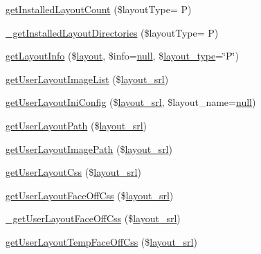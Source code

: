 \begin{DoxyCompactItemize}
\item 
\hyperlink{classlayoutModel_a0d0b74697a88270380a7f7afac1af96b}{get\+Installed\+Layout\+Count} (\$layout\+Type= \textquotesingle{}P\textquotesingle{})
\item 
\hyperlink{classlayoutModel_a4f50b5c829bf7c601a2938974a9a3b98}{\+\_\+get\+Installed\+Layout\+Directories} (\$layout\+Type= \textquotesingle{}P\textquotesingle{})
\item 
\hyperlink{classlayoutModel_a8f49f0b017ffa5fc1d12efd0dfab7c96}{get\+Layout\+Info} (\$\hyperlink{classlayout}{layout}, \$info=\hyperlink{modernizr_8min_8js_a286f9ec831c5e676eeb493248eab9575}{null}, \$\hyperlink{ko_8install_8php_a0532d89570cfdaebc628afac2ff5a81b}{layout\+\_\+type}=\char`\"{}P\char`\"{})
\item 
\hyperlink{classlayoutModel_a6bb9dc3b7dc427d7916bf2a743b8e412}{get\+User\+Layout\+Image\+List} (\$\hyperlink{ko_8install_8php_a70054876db09b2519a1726663c8dd9e7}{layout\+\_\+srl})
\item 
\hyperlink{classlayoutModel_acf8661d658078547d762fb582f09e3b9}{get\+User\+Layout\+Ini\+Config} (\$\hyperlink{ko_8install_8php_a70054876db09b2519a1726663c8dd9e7}{layout\+\_\+srl}, \$layout\+\_\+name=\hyperlink{modernizr_8min_8js_a286f9ec831c5e676eeb493248eab9575}{null})
\item 
\hyperlink{classlayoutModel_ad852fe1c8eab29b23c998560031eabe4}{get\+User\+Layout\+Path} (\$\hyperlink{ko_8install_8php_a70054876db09b2519a1726663c8dd9e7}{layout\+\_\+srl})
\item 
\hyperlink{classlayoutModel_a8d7574bcc9329207e6cc1eb2da163288}{get\+User\+Layout\+Image\+Path} (\$\hyperlink{ko_8install_8php_a70054876db09b2519a1726663c8dd9e7}{layout\+\_\+srl})
\item 
\hyperlink{classlayoutModel_a1c4e0310f7fce01392ddae5eeb849a5c}{get\+User\+Layout\+Css} (\$\hyperlink{ko_8install_8php_a70054876db09b2519a1726663c8dd9e7}{layout\+\_\+srl})
\item 
\hyperlink{classlayoutModel_a82cac2109b93170e8f573576de2eb0d0}{get\+User\+Layout\+Face\+Off\+Css} (\$\hyperlink{ko_8install_8php_a70054876db09b2519a1726663c8dd9e7}{layout\+\_\+srl})
\item 
\hyperlink{classlayoutModel_ab8fbcb8e92739d001e4a010bc5c5cf3b}{\+\_\+get\+User\+Layout\+Face\+Off\+Css} (\$\hyperlink{ko_8install_8php_a70054876db09b2519a1726663c8dd9e7}{layout\+\_\+srl})
\item 
\hyperlink{classlayoutModel_aadc68d3ed9d3706536ff8d93d1aebd56}{get\+User\+Layout\+Temp\+Face\+Off\+Css} (\$\hyperlink{ko_8install_8php_a70054876db09b2519a1726663c8dd9e7}{layout\+\_\+srl})

\end{DoxyCompactItemize}
